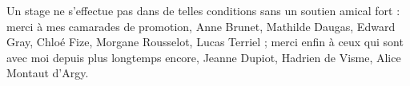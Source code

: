 Un stage ne s'effectue pas dans de telles conditions sans un soutien amical fort : merci à mes camarades de promotion, Anne Brunet, Mathilde Daugas, Edward Gray, Chloé Fize, Morgane Rousselot, Lucas Terriel ; merci enfin à ceux qui sont avec moi depuis plus longtemps encore, Jeanne Dupiot, Hadrien de Visme, Alice Montaut d'Argy.